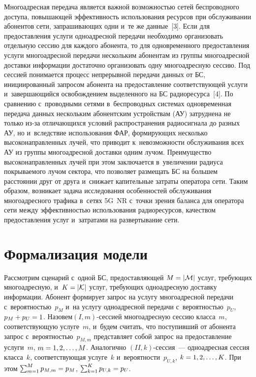 \begin{multicols}{2}
  Многоадресная передача является важ\-ной возможностью сетей 
беспроводного доступа, по\-вы\-ша\-ющей эф\-фек\-тив\-ность использования ресурсов 
при обслуживании абонентов сети, за\-пра\-ши\-ва\-ющих одни и~те же данные~[3]. 
Если для предоставления услуги одноадресной передачи необходимо 
организовать отдельную сессию для каждого абонента, то для одновременного 
предоставления услуги многоадресной передачи нескольким абонентам из 
группы многоадресной до\-став\-ки информации достаточно организовать одну 
многоадресную сессию. Под сессией понимается процесс непрерывной 
передачи данных от БС, ини\-ци\-иро\-ван\-ный запросом абонента на 
предостав\-ле\-ние со\-от\-вет\-ст\-ву\-ющей услуги и~завершающийся освобождением 
выделенного на БС радиоресурса~[4]. По сравнению с~проводными сетями 
в~беспроводных сис\-те\-мах одновременная передача данных нескольким 
абонентским устройствам (АУ) за\-труд\-не\-на не только из-за от\-ли\-ча\-ющих\-ся 
условий распространения радиосигнала до разных АУ, но и~вследствие 
использования ФАР, фор\-ми\-ру\-ющих 
несколько вы\-со\-ко\-на\-прав\-лен\-ных лучей, что приводит к~не\-воз\-мож\-ности 
обслуживания всех АУ из группы многоадресной до\-став\-ки 
одним лучом. Преимущество вы\-со\-ко\-на\-прав\-лен\-ных лучей при этом заключается 
в~увеличении радиуса по\-кры\-ва\-емо\-го лучом сек\-то\-ра, что поз\-во\-ля\-ет размещать 
БС на большем расстоянии друг от друга и~снижает капительные затраты 
оператора сети. Таким образом, возникает задача исследования особенностей 
обслуживания многоадресного трафика в~сетях 5G~NR с~точ\-ки зрения баланса 
для оператора сети между эф\-фек\-тив\-ностью использования радиоресурсов, 
качеством предостав\-ле\-ния услуг и~за\-тра\-та\-ми на развертывание сети.

\vspace*{-6pt}
  
\section{Формализация модели}

  Рассмотрим сценарий с~одной БС, предоставляющей $M\hm= \vert 
\mathcal{M}\vert$ услуг, тре\-бу\-ющих многоадресную, и~$K\hm= 
\vert\mathcal{K}\vert$ услуг, тре\-бу\-ющих одноадресную доставку информации. 
Абонент формирует запрос на услугу многоадресной передачи с~ве\-ро\-ят\-ностью~$p_M$ 
  и~на услугу одноадресной передачи с~ве\-ро\-ят\-ностью~$p_U$, 
$p_M\hm+p_U\hm=1$. Назовем\linebreak $({I}, m)$-сес\-си\-ей многоадресную 
сессию класса~$m$, со\-от\-вет\-ст\-ву\-ющую услуге~$m$, и~будем считать, что 
по\-сту\-пив\-ший от абонента запрос с~ве\-ро\-ят\-ностью~$p_{M,m}$ пред\-став\-ля\-ет 
собой запрос на предостав\-ле\-ние услуги~$m$, $m\hm= 1,2,\ldots , M$. 
Аналогично $({II}, k)$-сес\-сия~--- одноадресная сессия класса~$k$, 
со\-от\-вет\-ст\-ву\-ющая услуге~$k$ и~ве\-ро\-ят\-ности~$p_{U,k}$, $k\hm= 1,2,\ldots, K$. 
При этом $\sum\nolimits^M_{m=1} p_{M,m} \hm= p_M$, 
$\sum\nolimits^K_{k=1} p_{U,k} \hm= p_U$.
  

\end{multicols}

